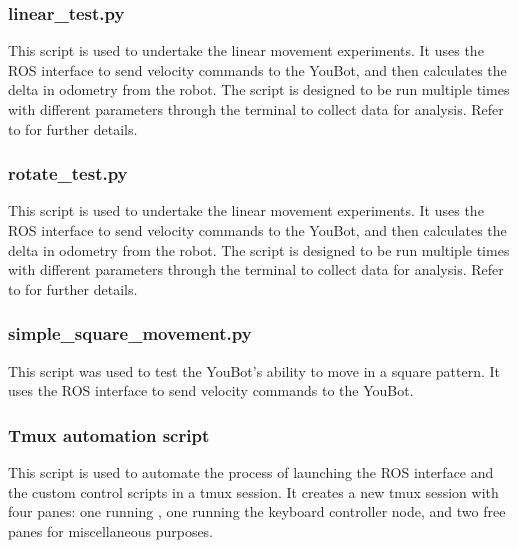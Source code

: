 \documentclass[a4paper, 12pt]{article}
\newif\ifshownotes
\newcommand{\notes}[1]{\ifshownotes\textcolor{blue}{#1}\fi}
\newcommand{\code}[1]{\texttt{\detokenize{#1}}}
\begin{document}
    \subsubsection{linear\_test.py}
    This script is used to undertake the linear movement experiments. It uses the ROS interface to send velocity commands to the YouBot, and then calculates the delta in odometry from the robot. The script is designed to be run multiple times with different parameters through the terminal to collect data for analysis. Refer to \notes{insert something here idr} for further details.
    
    \pagebreak
    \subsubsection{rotate\_test.py}
    This script is used to undertake the linear movement experiments. It uses the ROS interface to send velocity commands to the YouBot, and then calculates the delta in odometry from the robot. The script is designed to be run multiple times with different parameters through the terminal to collect data for analysis. Refer to \notes{insert something here idr} for further details.
    
    \pagebreak
    \subsubsection{simple\_square\_movement.py}
    This script was used to test the YouBot's ability to move in a square pattern. It uses the ROS interface to send velocity commands to the YouBot. 
    
    \pagebreak
    \subsubsection{Tmux automation script} 
    This script is used to automate the process of launching the ROS interface and the custom control scripts in a tmux session. It creates a new tmux session with four panes: one running \code{the YouBot-ROS interface}, one running the keyboard controller node, and two free panes for miscellaneous purposes.
    
\end{document}
